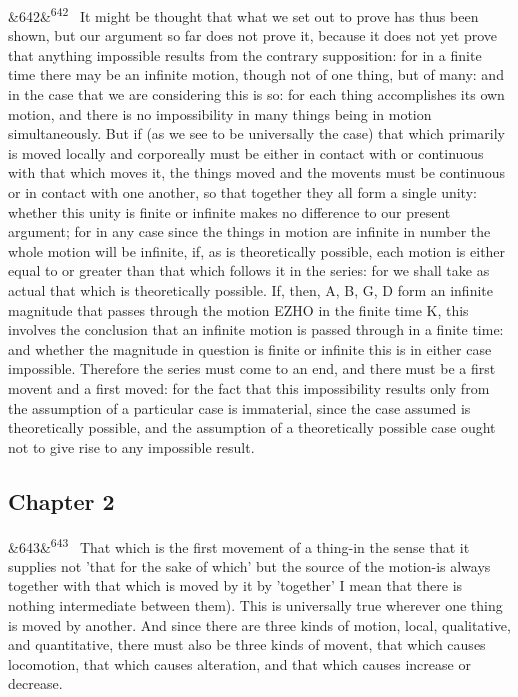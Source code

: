 \documentclass[12pt]{article}
\newcommand{\para}[1][]{\par\noindent\ifx&#1&\else\textsuperscript{\footnotesize #1}~\fi}
\begin{document}
\para[642] It might be thought that what we set out to prove has thus been shown, but our argument so far does not prove it, because it does not yet prove that anything impossible results from the contrary supposition: for in a finite time there may be an infinite motion, though not of one thing, but of many: and in the case that we are considering this is so: for each thing accomplishes its own motion, and there is no impossibility in many things being in motion simultaneously. But if (as we see to be universally the case) that which primarily is moved locally and corporeally must be either in contact with or continuous with that which moves it, the things moved and the movents must be continuous or in contact with one another, so that together they all form a single unity: whether this unity is finite or infinite makes no difference to our present argument; for in any case since the things in motion are infinite in number the whole motion will be infinite, if, as is theoretically possible, each motion is either equal to or greater than that which follows it in the series: for we shall take as actual that which is theoretically possible. If, then, A, B, G, D form an infinite magnitude that passes through the motion EZHO in the finite time K, this involves the conclusion that an infinite motion is passed through in a finite time: and whether the magnitude in question is finite or infinite this is in either case impossible. Therefore the series must come to an end, and there must be a first movent and a first moved: for the fact that this impossibility results only from the assumption of a particular case is immaterial, since the case assumed is theoretically possible, and the assumption of a theoretically possible case ought not to give rise to any impossible result.

\subsection*{Chapter 2}

\para[643] That which is the first movement of a thing-in the sense that it supplies not 'that for the sake of which' but the source of the motion-is always together with that which is moved by it by 'together' I mean that there is nothing intermediate between them). This is universally true wherever one thing is moved by another. And since there are three kinds of motion, local, qualitative, and quantitative, there must also be three kinds of movent, that which causes locomotion, that which causes alteration, and that which causes increase or decrease.
\end{document}
